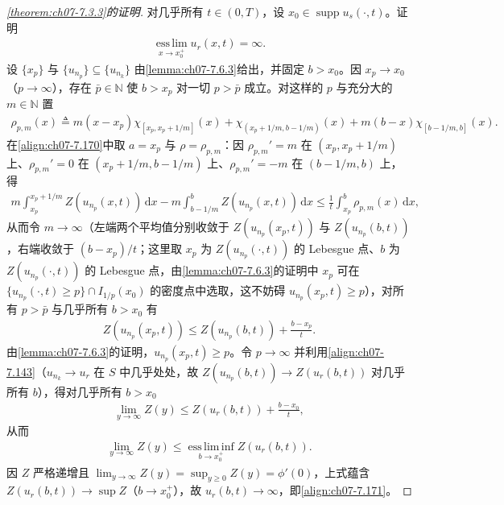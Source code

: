 \documentclass[../../main.tex]{subfiles}%
\begin{document}
\begin{proof}[\cref{theorem:ch07-7.3.3}的证明]
对几乎所有 $t\in(0,T)$，设 $x_0\in\operatorname{supp}u_s(\cdot,t)$。证明
\begin{align}
\operatorname*{ess\,lim}_{x\to x_0^+}u_r(x,t)=\infty. \label{align:ch07-7.171}
\end{align}
设 $\{x_p\}$ 与 $\{u_{n_p}\}\subseteq\{u_{n_k}\}$ 由\cref{lemma:ch07-7.6.3}给出，并固定 $b>x_0$。因 $x_p\to x_0$（$p\to\infty$），存在 $\bar p\in\mathbb{N}$ 使 $b>x_p$ 对一切 $p>\bar p$ 成立。对这样的 $p$ 与充分大的 $m\in\mathbb{N}$ 置
\begin{align*}
\rho_{p,m}(x)\triangleq m(x-x_p)\chi_{[x_p,x_p+1/m]}(x)+\chi_{(x_p+1/m,b-1/m)}(x)+m(b-x)\chi_{[b-1/m,b]}(x).
\end{align*}
在\eqref{align:ch07-7.170}中取 $a=x_p$ 与 $\rho=\rho_{p,m}$：因 $\rho_{p,m}'=m$ 在 $(x_p,x_p+1/m)$ 上、$\rho_{p,m}'=0$ 在 $(x_p+1/m,b-1/m)$ 上、$\rho_{p,m}'=-m$ 在 $(b-1/m,b)$ 上，得
\begin{align*}
m\int_{x_p}^{x_p+1/m}Z(u_{n_p}(x,t))\,\mathrm{d}x-m\int_{b-1/m}^bZ(u_{n_p}(x,t))\,\mathrm{d}x\leqslant\frac1t\int_{x_p}^b\rho_{p,m}(x)\,\mathrm{d}x,
\end{align*}
从而令 $m\to\infty$（左端两个平均值分别收敛于 $Z(u_{n_p}(x_p,t))$ 与 $Z(u_{n_p}(b,t))$，右端收敛于 $(b-x_p)/t$；这里取 $x_p$ 为 $Z(u_{n_p}(\cdot,t))$ 的 Lebesgue 点、$b$ 为 $Z(u_{n_p}(\cdot,t))$ 的 Lebesgue 点，由\cref{lemma:ch07-7.6.3}的证明中 $x_p$ 可在 $\{u_{n_p}(\cdot,t)\geqslant p\}\cap I_{1/p}(x_0)$ 的密度点中选取，这不妨碍 $u_{n_p}(x_p,t)\geqslant p$），对所有 $p>\bar p$ 与几乎所有 $b>x_0$ 有
\begin{align*}
Z(u_{n_p}(x_p,t))\leqslant Z(u_{n_p}(b,t))+\frac{b-x_p}{t}.
\end{align*}
由\cref{lemma:ch07-7.6.3}的证明，$u_{n_p}(x_p,t)\geqslant p$。令 $p\to\infty$ 并利用\eqref{align:ch07-7.143}（$u_{n_k}\to u_r$ 在 $S$ 中几乎处处，故 $Z(u_{n_p}(b,t))\to Z(u_r(b,t))$ 对几乎所有 $b$），得对几乎所有 $b>x_0$
\begin{align}
\lim_{y\to\infty}Z(y)\leqslant Z(u_r(b,t))+\frac{b-x_0}{t}, \label{align:ch07-7.172}
\end{align}
从而
\begin{align*}
\lim_{y\to\infty}Z(y)\leqslant\operatorname*{ess\,lim\,inf}_{b\to x_0^+}Z(u_r(b,t)).
\end{align*}
因 $Z$ 严格递增且 $\lim_{y\to\infty}Z(y)=\sup_{y\geqslant0}Z(y)=\phi'(0)$，上式蕴含 $Z(u_r(b,t))\to\sup Z$（$b\to x_0^+$），故 $u_r(b,t)\to\infty$，即\eqref{align:ch07-7.171}。


\end{proof}
\end{document}

